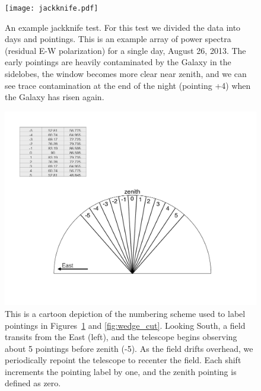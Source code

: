 \documentclass[iop]{emulateapj}
\begin{document}
\begin{figure}
\begin{center}
\texttt{[image: jackknife.pdf]}
\caption[Per pointing jackknife]{An example jackknife test. For this test we divided the data 
into days and pointings. This is an example array of power spectra (residual E-W 
polarization) for a single day, August 26, 2013. The early pointings are heavily contaminated 
by the Galaxy in the sidelobes, the window becomes more clear near zenith, and we can 
see trace contamination at the end of the night (pointing +4) when the Galaxy has risen 
again.
\label{fig:jackknife}
}
\end{center}
\end{figure}

\begin{figure}
\begin{center}
\includegraphics[width=\columnwidth]{pointing_cartoon.pdf}
\caption{This is a cartoon depiction of the numbering scheme used to label pointings in
Figures~\ref{fig:jackknife} and \ref{fig:wedge_cut}. Looking South, a field transits from the
East (left), and the telescope begins observing about 5 pointings before zenith (-5). As the
field drifts overhead, we periodically repoint the telescope to recenter the field. Each shift
increments the pointing label by one, and the zenith pointing is defined as zero.
\label{fig:pointing}
}
\end{center}
\end{figure}
\end{document}
